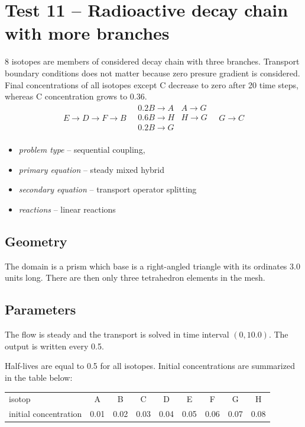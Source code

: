 \section{Test 11 -- Radioactive decay chain with more branches}
8 isotopes are members of considered decay chain with three branches. Transport boundary conditions does not matter because zero presure gradient is considered. Final concentrations of all isotopes except C decrease to zero after 20 time steps, whereas C concentration grows to 0.36.
\[
 E\xrightarrow{}D\xrightarrow{}F\xrightarrow{}B
 \quad
 \begin{matrix}
    0.2B\xrightarrow{}A & A\xrightarrow{}G \\
    0.6B\xrightarrow{}H & H\xrightarrow{}G \\
    0.2B\xrightarrow{}G &\\
 \end{matrix}
 \quad
 G\xrightarrow{}C 
\]

\begin{itemize} 
    \item \emph{problem type} -- sequential coupling, 
    \item \emph{primary equation} -- steady mixed hybrid
    \item \emph{secondary equation} -- transport operator splitting
    \item \emph{reactions} -- linear reactions
  \end{itemize}

\subsection*{Geometry}
The domain is a prism which base is a right-angled triangle with its ordinates 3.0 units long. There are then only three tetrahedron elements in the mesh.

\subsection*{Parameters}
The flow is steady and the transport is solved in time interval $(0,10.0)$. The output is written every 0.5.

Half-lives are equal to 0.5 for all isotopes. Initial concentrations are summarized in the table below:
  \begin{center}
    \begin{tabular}[c]{|l|c|c|c|c|c|c|c|c|}
      \hline
      isotop & A & B  & C & D & E & F & G & H \\[4pt]
      initial concentration & 0.01 & 0.02 & 0.03 & 0.04 & 0.05 & 0.06 & 0.07 & 0.08 \\[4pt]
      \hline
    \end{tabular}
  \end{center}



